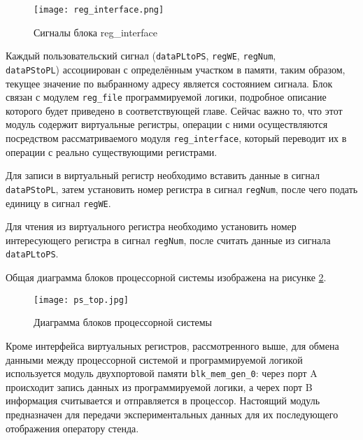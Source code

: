 \begin{figure}[ht]
    \centering
    \texttt{[image: reg\_interface.png]}
    \caption{Сигналы блока reg\_interface}
    \label{fig:reg_interface}
\end{figure}
Каждый пользовательский сигнал (\texttt{dataPLtoPS}, \texttt{regWE}, \texttt{regNum}, \\\texttt{dataPStoPL}) ассоциирован с определённым участком в памяти, таким образом, текущее значение по выбранному адресу является состоянием сигнала. Блок связан с модулем \texttt{reg\_file} программируемой логики, подробное описание которого будет приведено в соответствующей главе. Сейчас важно то, что этот модуль содержит виртуальные регистры, операции с ними осуществляются посредством рассматриваемого модуля \texttt{reg\_interface}, который переводит их в операции с реально существующими регистрами.\par
Для записи в виртуальный регистр необходимо вставить данные в сигнал \texttt{dataPStoPL}, затем установить номер регистра в сигнал \texttt{regNum}, после чего подать единицу в сигнал \texttt{regWE}.\par
Для чтения из виртуального регистра необходимо установить номер интересующего регистра в сигнал \texttt{regNum}, после считать данные из сигнала \texttt{dataPLtoPS}.\par
Общая диаграмма блоков процессорной системы изображена на рисунке \ref{fig:ps_top}.\par
\begin{figure}[ht]
    \centering
    \texttt{[image: ps\_top.jpg]}
    \caption{Диаграмма блоков процессорной системы}
    \label{fig:ps_top}
\end{figure}
Кроме интерфейса виртуальных регистров, рассмотренного выше, для обмена данными между процессорной системой и программируемой логикой используется модуль двухпортовой памяти \texttt{blk\_mem\_gen\_0}: через порт A происходит запись данных из программируемой логики, а черех порт B информация считывается и отправляется в процессор. Настоящий модуль предназначен для передачи экспериментальных данных для их последующего отображения оператору стенда.\par
